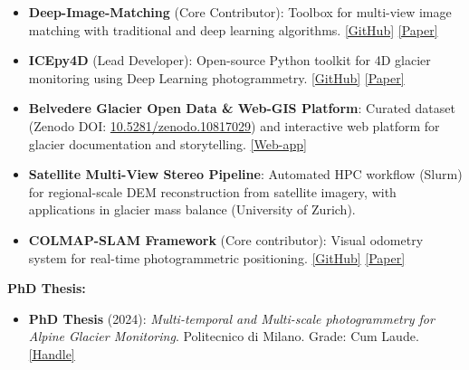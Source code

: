 \documentclass{cv_style} %
\begin{document}
\begin{itemize}[nosep]
    \item \textbf{Deep-Image-Matching} (Core Contributor): Toolbox for multi-view image matching with traditional and deep learning algorithms. \href{https://github.com/3DOM-FBK/deep-image-matching}{[GitHub]} \href{https://doi.org/10.5194/isprs-archives-XLVIII-2-W4-2024-309-2024}{[Paper]}

    \item \textbf{ICEpy4D} (Lead Developer): Open-source Python toolkit for 4D glacier monitoring using Deep Learning photogrammetry. \href{https://github.com/franioli/icepy4d}{[GitHub]} \href{https://doi.org/10.5194/isprs-archives-XLVIII-1-W2-2023-1037-2023}{[Paper]}

    \item \textbf{Belvedere Glacier Open Data \& Web-GIS Platform}: Curated dataset (Zenodo DOI: \href{https://doi.org/10.5281/zenodo.10817029}{10.5281/zenodo.10817029}) and interactive web platform for glacier documentation and storytelling. \href{https://thebelvedereglacier.it/}{[Web-app]}

    \item \textbf{Satellite Multi-View Stereo Pipeline}: Automated HPC workflow (Slurm) for regional-scale DEM reconstruction from satellite imagery, with applications in glacier mass balance (University of Zurich).

    \item \textbf{COLMAP-SLAM Framework} (Core contributor): Visual odometry system for real-time photogrammetric positioning. \href{https://github.com/3DOM-FBK/COLMAP_SLAM}{[GitHub]} \href{https://doi.org/10.5194/isprs-archives-XLVIII-1-W1-2023-317-2023}{[Paper]}
\end{itemize}

\vspace{4pt}
\textbf{PhD Thesis:}
\begin{itemize}[nosep]
    \item \textbf{PhD Thesis} (2024): \textit{Multi-temporal and Multi-scale photogrammetry for Alpine Glacier Monitoring}. Politecnico di Milano. Grade: Cum Laude. \href{https://hdl.handle.net/10589/224092}{[Handle]}
\end{itemize}

\vspace{4pt}

\end{document}
